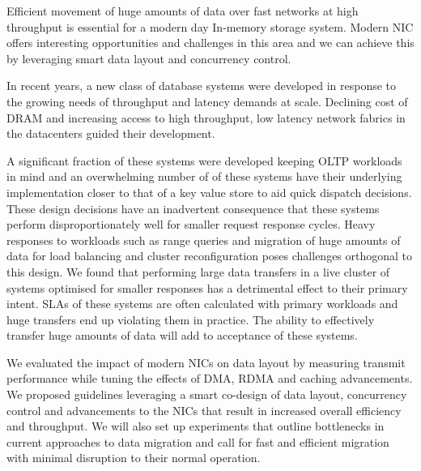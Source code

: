 

Efficient movement of huge amounts of data over fast networks at high throughput 
is essential for a modern day In-memory storage system. Modern NIC offers interesting
opportunities and challenges in this area and we can achieve this by leveraging smart data layout
and concurrency control.

In recent years, a new class of database systems were developed in response to the growing needs of throughput
and latency demands at scale. Declining cost of DRAM and increasing access to 
high throughput, low latency network fabrics in the datacenters guided their development.

A significant fraction of these systems were developed keeping OLTP workloads in mind 
and an overwhelming number of of these systems have their underlying
implementation closer to that of a key value store to aid quick dispatch decisions. These design 
decisions have an inadvertent consequence that these systems perform disproportionately
well for smaller request response cycles. Heavy responses to workloads such as range queries
and migration of huge amounts of data for load balancing and cluster reconfiguration
poses challenges orthogonal to this design. We found that performing large data transfers in a live cluster 
of systems optimised for smaller responses has a detrimental effect to their primary intent. 
SLAs of these systems are often calculated with primary workloads and huge transfers end 
up violating them in practice. The ability to effectively transfer huge amounts of
data will add to acceptance of these systems.

We evaluated the impact of modern NICs on data layout by measuring transmit performance
while tuning the effects of DMA, RDMA and caching advancements. We proposed guidelines
leveraging a smart co-design of data layout, concurrency control and advancements to the
NICs that result in increased overall efficiency and throughput. We will also set up experiments
that outline bottlenecks in current approaches to data migration and call for fast and 
efficient migration with minimal disruption to their normal operation.